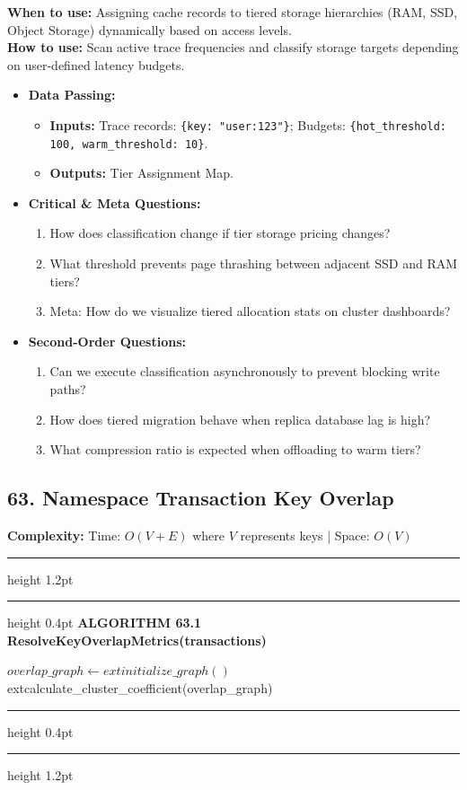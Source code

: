\documentclass[11pt,a4paper]{article}
\newenvironment{textbookalgo}[2]{%
  \par\addvspace{1.2em}\noindent
  \hrule height 1.2pt
  \vspace{1.5pt}
  \hrule height 0.4pt
  \vspace{5pt}
  {\noindent\large\bfseries\sffamily ALGORITHM #1 \quad #2}
  \par\vspace{5pt}
  \RestyleAlgo{plain}
}{%
  \par\vspace{4pt}
  \hrule height 0.4pt
  \vspace{1.5pt}
  \hrule height 1.2pt
  \par\addvspace{1.2em}
}
\theoremstyle{definition}
\begin{document}
\noindent
\textbf{When to use:} Assigning cache records to tiered storage hierarchies (RAM, SSD, Object Storage) dynamically based on access levels.\\
\textbf{How to use:} Scan active trace frequencies and classify storage targets depending on user-defined latency budgets.
\begin{itemize}[leftmargin=*]
  \item[] \textbf{Data Passing:}
    \begin{itemize}
      \item \textbf{Inputs:} Trace records: \texttt{\{key: "user:123"\}}; Budgets: \texttt{\{hot\_threshold: 100, warm\_threshold: 10\}}.
      \item \textbf{Outputs:} Tier Assignment Map.
    \end{itemize}
  \item[] \textbf{Critical \& Meta Questions:}
  \begin{enumerate}
    \item How does classification change if tier storage pricing changes?
    \item What threshold prevents page thrashing between adjacent SSD and RAM tiers?
    \item Meta: How do we visualize tiered allocation stats on cluster dashboards?
  \end{enumerate}
  \item[] \textbf{Second-Order Questions:}
  \begin{enumerate}
    \item Can we execute classification asynchronously to prevent blocking write paths?
    \item How does tiered migration behave when replica database lag is high?
    \item What compression ratio is expected when offloading to warm tiers?
  \end{enumerate}
\end{itemize}
\medskip

\clearpage
\subsection{63. Namespace Transaction Key Overlap}


\noindent
\textbf{Complexity:} Time: $O(V + E)$ where $V$ represents keys | Space: $O(V)$
\smallskip

\begin{textbookalgo}{63.1}{ResolveKeyOverlapMetrics(transactions)}
\begin{algorithm}[H]
$overlap\_graph \leftarrow 	ext{initialize\_graph}()$\;
\Return 	ext{calculate\_cluster\_coefficient}(overlap\_graph)\;
\end{algorithm}
\end{textbookalgo}
\end{document}
